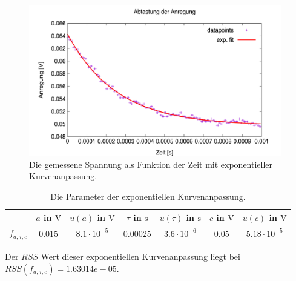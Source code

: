 \documentclass[../../main.tex]{subfiles}
\begin{document}
    \begin{figure}[H]
        \centering
        \includegraphics[width=11cm]{../../Bilddateien/2/spontane_emission_data_t_expfit.png}
        \caption{Die gemessene Spannung als Funktion der Zeit mit exponentieller Kurvenanpassung.}
        \label{fig:2:spontaneEmissionDataTExpFit}
    \end{figure}

    \begin{table}[H]
        \centering
        \begin{tabular}{c|cc|cc|cc}
            \hline
             & $a$ in $\si{\volt}$ & $u(a)$ in $\si{\volt}$ & $\tau$ in $\si{\s}$ & $u(\tau)$ in $\si{\s}$ & $c$ in $\si{\volt}$ & $u(c)$ in $\si{\volt}$ \\
            \hline\hline
            $f_{a,\tau,c}$ & $0.015$ & $8.1\cdot 10^{-5}$ & $0.00025$ & $3.6\cdot 10^{-6}$ & $0.05$ & $5.18\cdot 10^{-5}$ \\
            \hline
        \end{tabular}
        \caption{Die Parameter der exponentiellen Kurvenanpassung.}
        \label{tab:2:spontaneEmissionDataTExpFit}
    \end{table}
    Der $RSS$ Wert dieser exponentiellen Kurvenanpassung liegt bei $RSS(f_{a,\tau,c}) = 1.63014e-05$.
\end{document}
